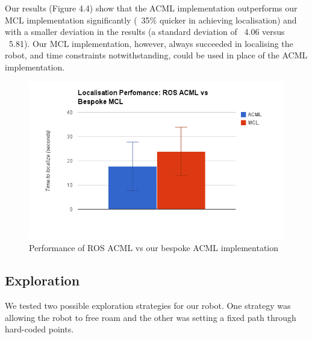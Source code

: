 \documentclass{article}
\begin{document}
\begin{multicols}{2}
Our results (Figure 4.4) show that the ACML implementation outperforms our MCL implementation significantly (~35\% quicker in achieving localisation) and with a smaller deviation in the results (a standard deviation of ~4.06 versus ~5.81). Our MCL implementation, however, always succeeded in localising the robot, and time constraints notwithstanding, could be used in place of the ACML implementation.
	\begin{figure}[H]
	\centering
	\includegraphics[width=\linewidth]{ExperimentalResults8}
	\caption{Performance of ROS ACML vs our bespoke ACML implementation}
	\end{figure}
	
	
	
	
	
	\subsection{Exploration}
	We tested two possible exploration strategies for our robot. One strategy was allowing the robot to free roam and the other was setting a fixed path through hard-coded points.
	

\end{multicols}
\end{document}
